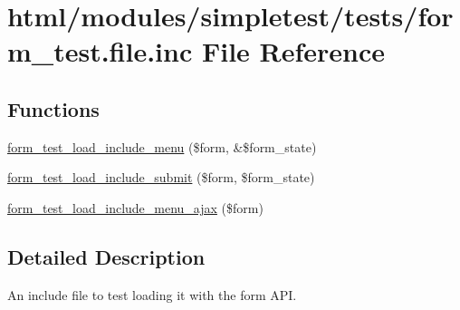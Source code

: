 \hypertarget{form__test_8file_8inc}{
\section{html/modules/simpletest/tests/form\_\-test.file.inc File Reference}
\label{form__test_8file_8inc}
}
\subsection*{Functions}
\begin{DoxyCompactItemize}
\item 
\hyperlink{form__test_8file_8inc_a8541cacf0e13a752a3329eed7dbe9022}{form\_\-test\_\-load\_\-include\_\-menu} (\$form, \&\$form\_\-state)
\item 
\hyperlink{form__test_8file_8inc_aa9a7c6ed94f2a375804faa39d19f62e0}{form\_\-test\_\-load\_\-include\_\-submit} (\$form, \$form\_\-state)
\item 
\hyperlink{form__test_8file_8inc_a72729f4f41be302b7921a375fe05da6a}{form\_\-test\_\-load\_\-include\_\-menu\_\-ajax} (\$form)
\end{DoxyCompactItemize}


\subsection{Detailed Description}
An include file to test loading it with the form API. 

